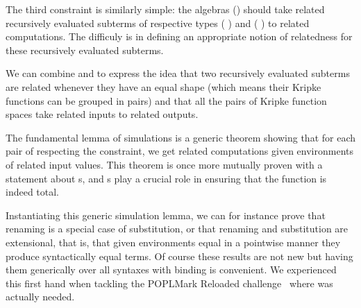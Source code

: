 The third constraint is similarly simple: the algebras () should take
related recursively evaluated subterms of respective types
   (  ) and
   (  ) to related computations.
The difficuly is in defining an appropriate notion of relatedness 
for these recursively evaluated subterms.

\begin{agdasnippet}
\addtolength{\leftskip}{\parindent}
\end{agdasnippet}

We can combine  and  to express the idea that two recursively
evaluated subterms are related whenever they have an equal shape (which means their
Kripke functions can be grouped in pairs) and that all the pairs of Kripke function
spaces take related inputs to related outputs.

\begin{agdasnippet}
\addtolength{\leftskip}{\parindent}
\end{agdasnippet}

The fundamental lemma of simulations is a generic theorem showing that for
each pair of \semrec{} respecting the  constraint, we
get related computations given environments of related input values.
This theorem is once more mutually
proven with a statement about s,
and s play a crucial role in ensuring that the function is indeed total.

\begin{agdasnippet}
  \addtolength{\leftskip}{\parindent}
\end{agdasnippet}

Instantiating this generic simulation lemma, we can for instance prove
that renaming is a special case of substitution, or that renaming and
substitution are extensional, that is, that given environments equal in
a pointwise manner they produce syntactically equal terms. Of course these
results are not new but having them generically over all syntaxes with
binding is convenient. We experienced this first hand when tackling the
POPLMark Reloaded challenge~\citeyear{poplmarkreloaded} where
 was actually needed.

\begin{agdasnippet}
\end{agdasnippet}

